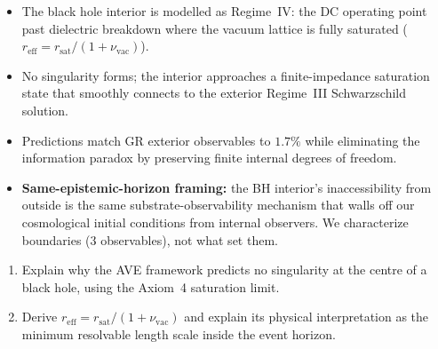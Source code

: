 \begin{summarybox}
\begin{itemize}
    \item The black hole interior is modelled as Regime~IV: the DC operating point past dielectric breakdown where the vacuum lattice is fully saturated ($r_{\text{eff}} = r_{\text{sat}}/(1 + \nu_{\text{vac}})$).
    \item No singularity forms; the interior approaches a finite-impedance saturation state that smoothly connects to the exterior Regime~III Schwarzschild solution.
    \item Predictions match GR exterior observables to $1.7\%$ while eliminating the information paradox by preserving finite internal degrees of freedom.
    \item \textbf{Same-epistemic-horizon framing:} the BH interior's
          inaccessibility from outside is the same substrate-observability
          mechanism that walls off our cosmological initial conditions
          from internal observers. We characterize boundaries (3 observables),
          not what set them.
\end{itemize}
\end{summarybox}

\begin{exercisebox}
\begin{enumerate}
    \item Explain why the AVE framework predicts no singularity at the centre of a black hole, using the Axiom~4 saturation limit.
    \item Derive $r_{\text{eff}} = r_{\text{sat}}/(1 + \nu_{\text{vac}})$ and explain its physical interpretation as the minimum resolvable length scale inside the event horizon.
\end{enumerate}
\end{exercisebox}


